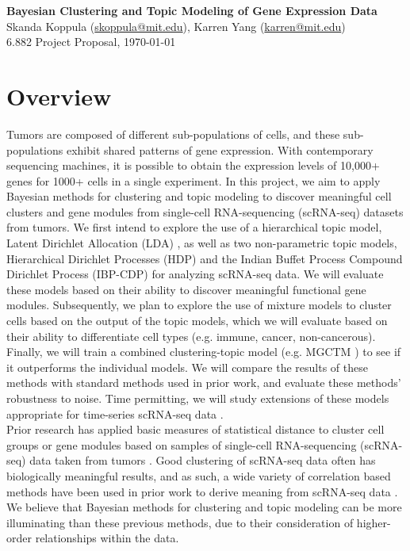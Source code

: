 \documentclass[11pt]{article}
\begin{document}
\begin{centering}
\Large
    \textbf{Bayesian Clustering and Topic Modeling of Gene Expression Data}  \\
    \vspace{2mm}
    \normalsize
    Skanda Koppula (\url{skoppula@mit.edu}), Karren Yang (\url{karren@mit.edu}) \\
    \vspace{2mm}
    \normalsize
    6.882 Project Proposal, \today \\
\end{centering}
\vspace{5mm}

\section{Overview}

Tumors are composed of different sub-populations of cells, and these sub-populations exhibit shared patterns of gene expression. With contemporary sequencing machines, it is possible to obtain the expression levels of 10,000+ genes for 1000+ cells in a single experiment. In this project, we aim to apply Bayesian methods for clustering and topic modeling to discover meaningful cell clusters and gene modules from single-cell RNA-sequencing (scRNA-seq) datasets from tumors. We first intend to explore the use of a hierarchical topic model, Latent Dirichlet Allocation (LDA) \cite{LDA}, as well as two non-parametric topic models, Hierarchical Dirichlet Processes (HDP) \cite{HDP} and the Indian Buffet Process Compound Dirichlet Process (IBP-CDP) \cite{IBP} for analyzing scRNA-seq data. We will evaluate these models based on their ability to discover meaningful functional gene modules. Subsequently, we plan to explore the use of mixture models to cluster cells based on the output of the topic models, which we will evaluate based on their ability to differentiate cell types (e.g. immune, cancer, non-cancerous). Finally, we will train a combined clustering-topic model (e.g. MGCTM \cite{pengtao}) to see if it outperforms the individual models. We will compare the results of these methods with standard methods used in prior work, and evaluate these methods' robustness to noise. Time permitting, we will study extensions of these models appropriate for time-series scRNA-seq data \cite{TS-DDP}. \\

Prior research has applied basic measures of statistical distance to cluster cell groups or gene modules based on samples of single-cell RNA-sequencing (scRNA-seq) data taken from tumors \cite{nature}.  Good clustering of scRNA-seq data often has biologically meaningful results, and as such, a wide variety of correlation based methods have been used in prior work to derive meaning from scRNA-seq data \cite{coexpression, consensus, profiling}. We believe that Bayesian methods for clustering and topic modeling can be more illuminating than these previous methods, due to their consideration of higher-order relationships within the data. \\
\end{document}
